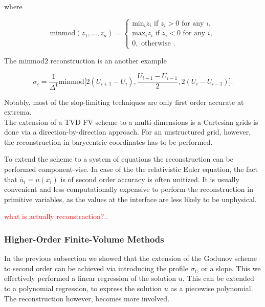 where

\begin{equation}
\text{minmod}(z_1,...,z_n) = 
\begin{cases}
\text{min}_i z_i \text{ if } z_i > 0 \text{ for any } i, \\
\text{max}_i z_i \text{ if } z_i < 0 \text{ for any } i, \\
0,  \text{               otherwise }.
\end{cases}
\end{equation}

The minmod$2$ reconstruction is an another example 

\begin{equation}
\sigma_i = \frac{1}{\Delta^1}\text{minmod}\Big[2(U_{i+1} - U_i), \frac{U_{i+1} - U_{i-1}}{2}, 2(U_i - U_{i-1})\Big].
\end{equation}

Notably, most of the slop-limiting techniques are only first order accurate at extrema. \\

The extension of a \ac{TVD} \ac{FV} scheme to a multi-dimensions is a Cartesian grids is done via a direction-by-direction approach. For an unstructured grid, however, the reconstruction in barycentric coordinates has to be performed. 

To extend the scheme to a system of equations the reconstruction can be performed component-vise. In case of the the relativistic Euler equation, the fact that $\bar{u}_i = u(x_i)$ is of second order accuracy is often unitized. It is usually convenient and less computationally expensive to perform the reconstruction in primitive variables, as the values at the interface are less likely to be unphysical. 

\textcolor{red}{what is actually reconstraction?..}



\subsubsection{Higher-Order Finite-Volume Methods}

In the previous subsection we showed that the extension of the Godunov scheme to second order can be achieved via introducing the profile $\sigma_i$, or a slope. This we effectively performed a linear regression of the solution $u$. This can be extended to a polynomial regression, to express the solution $u$ as a piecewise polynomial. The reconstruction however, becomes more involved.


